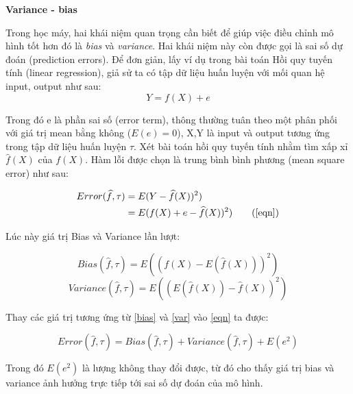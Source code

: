 \textbf{Variance - bias}

Trong học máy, hai khái niệm quan trọng cần biết để giúp việc điều chỉnh mô hình tốt hơn đó là \textit{bias} và \textit{variance}. Hai khái niệm này còn được gọi là sai số dự đoán (prediction errors). Để đơn giản, lấy ví dụ trong bài toán Hồi quy tuyến tính (linear regression), giả sử ta có tập dữ liệu huấn luyện với mối quan hệ input, output như sau:
\begin{equation}
    Y = f(X) + e
\end{equation}

Trong đó e là phần sai số (error term), thông thường tuân theo một phân phối với giá trị mean bằng không ($E(e)=0$), X,Y là input và output tương ứng trong tập dữ liệu huấn luyện $\tau$.
Xét bài toán hồi quy tuyến tính nhằm tìm xấp xỉ $\widehat{f}(X)$ của $f(X)$. Hàm lỗi được chọn là trung bình bình phương (mean square error) như sau:

\begin{subequations}\label{eqn}
    \begin{align*}
        Error(\widehat{f},\tau) & = E(Y- \widehat{f}(X))^2)                      \\
                                & = E(f(X)+e- \widehat{f}(X))^2) \tag{\ref{eqn}}
    \end{align*}
\end{subequations}

Lúc này giá trị Bias và Variance lần lượt:

\begin{equation}\label{bias}
    Bias(\widehat{f},\tau) = E(  (f(X) - E(   \widehat{f}(X)))^2 )
\end{equation}
\begin{equation}\label{var}
    Variance(\widehat{f},\tau) = E(  (E(\widehat{f}(X)) - \widehat{f}(X))^2 )
\end{equation}

Thay các giá trị tương ứng từ \ref{bias} và \ref{var} vào \ref{eqn} ta được:

\begin{equation}
    Error(\widehat{f},\tau) = Bias(\widehat{f},\tau) +  Variance(\widehat{f},\tau) + E(e^2)
\end{equation}

Trong đó $E(e^2)$ là lượng không thay đổi được, từ đó cho thấy giá trị bias và variance ảnh hưởng trực tiếp tới sai số dự đoán của mô hình.

